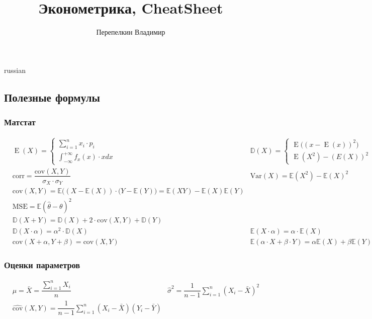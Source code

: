 \documentclass[9pt]{article}
\begin{document}
\title{\foreignlanguage{russian}{Эконометрика, CheatSheet}}
\author{\foreignlanguage{russian}{Перепелкин Владимир}}
\maketitle
\begin{otherlanguage*}{russian}
\subsection*{Полезные формулы}
\subsubsection*{Матстат}
\begin{align*}
&\operatorname{E} (X) = \begin{cases} 
\sum_{i=1}^n x_i \cdot p_i \\
\int_{-\infty}^{+\infty} f_x(x) \cdot x dx 
\end{cases} 
&\mathbb{D} (X) = \begin{cases} 
\operatorname{E} \big( (x - \operatorname{E}(x))^2\big) \\
\operatorname{E}(X^2) - (E(X))^2
\end{cases} \\
&\text{corr} = \dfrac{\text{cov} (X, Y)}{\sigma_X \cdot \sigma_Y}
& \text{Var} (X) = \mathbb{E} (X^2) - \mathbb{E} (X)^ 2 \\
& \text{cov} (X, Y) = \mathbb{E} \Big( (X - \mathbb{E} (X)) \cdot  (Y - \mathbb{E}(Y)\Big) = \mathbb{E}(XY) - \mathbb{E}(X) \mathbb{E}(Y) \\
&\text{MSE} = \mathbb{E} ( \hat \theta - \theta) ^ 2 \\
&\mathbb{D} (X + Y) = \mathbb{D} (X) + 2 \cdot \text{cov} (X, Y) + \mathbb{D} (Y)   \\
&\mathbb{D} (X \cdot \alpha) = \alpha^2 \cdot \mathbb{D} (X) 
&\mathbb{E} (X \cdot \alpha) = \alpha \cdot \mathbb{E} (X) \\
& \text{cov} (X + \alpha, Y + \beta) = \text{cov} (X, Y) 
& \mathbb{E} (\alpha \cdot X + \beta \cdot Y) = \alpha \mathbb{E} (X) + \beta \mathbb{E}(Y)
\end{align*} 
\subsubsection*{Оценки параметров}
\begin{align*}
&\hat \mu = \bar{X} = \dfrac{\sum_{i=1}^n X_i}{n}
&\widehat{\sigma}^2 = \dfrac{1}{n-1} \sum_{i=1}^n (X_i - \bar{X}) ^ 2 
\\
&\widehat{\text{cov}} (X, Y) = \dfrac{1}{n-1} \sum_{i=1}^n (X_i - \bar{X}) (Y_i - \bar{Y}) 
\end{align*}

\end{otherlanguage*}
\end{document}
